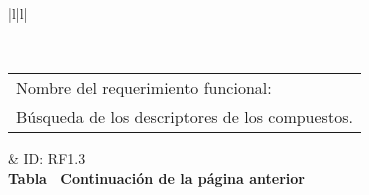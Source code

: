 \begin{longtable}{|l|l|}
\caption{Requerimiento funcional 1.3}
\label{RF1_3}\\
\hline
\begin{tabular}[c]{@{}l@{}}Nombre del requerimiento funcional:\\ Búsqueda de los descriptores de los compuestos.\end{tabular}                                                                                                                                                                                                               & ID: RF1.3                                                                                                                      \\ \hline
\endfirsthead
%
%
{{\bfseries Tabla \thetable\ Continuación de la página anterior}} \\
\endhead
%
                                                                                                                                                                                                                                                                                                                                                                                                                         \\ \hline
{}                                                                                                                                                                                                                                                                                                                                                                                                                                    \\ \hline
{}                                                                                                                                                                                                                                                                                                                                                                                                             \\ \hline

\end{longtable}
